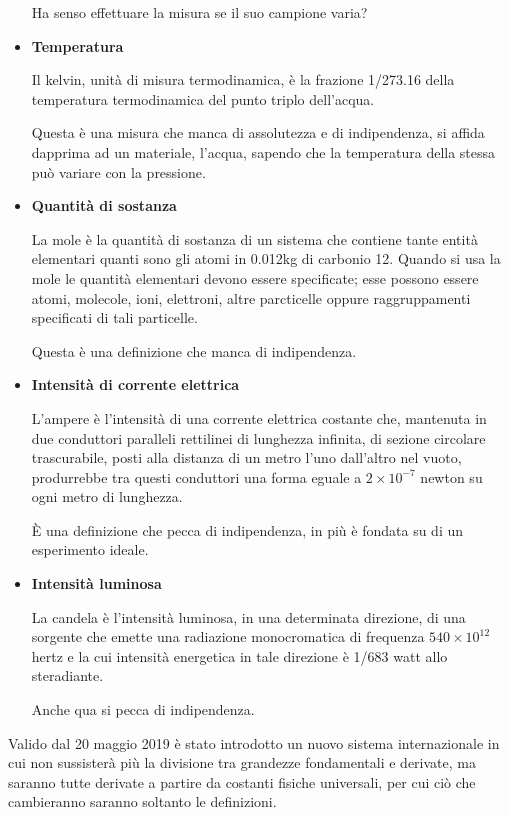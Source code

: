 \documentclass[a4paper, 15pt]{article}
\begin{document}
\begin{adjustwidth}{2in}{}
\begin{itemize}
		Ha senso effettuare la misura se il suo campione varia? 
		
		\item \textbf{Temperatura} 
		
		Il kelvin, unità di misura termodinamica, è la frazione 1/273.16 della temperatura termodinamica del punto triplo dell'acqua. 
		
		Questa è una misura che manca di assolutezza e di indipendenza, si affida dapprima ad un materiale, l'acqua, sapendo che la temperatura della stessa può variare con la pressione.
		
		\item \textbf{Quantità di sostanza }
		
		La mole è la quantità di sostanza di un sistema che contiene tante entità elementari quanti sono gli atomi in 0.012kg di carbonio 12. Quando si usa la mole le quantità elementari devono essere specificate; esse possono essere atomi, molecole, ioni, elettroni, altre parcticelle oppure raggruppamenti specificati di tali particelle. \newline
		
		Questa è una definizione che manca di indipendenza. 
		
		\item \textbf{Intensità di corrente elettrica} 
		
		L'ampere è l'intensità di una corrente elettrica costante che, mantenuta in due conduttori paralleli rettilinei di lunghezza infinita, di sezione circolare trascurabile, posti alla distanza di un metro l'uno dall'altro nel vuoto, produrrebbe tra questi conduttori una forma eguale a $2\times10^{-7}$ newton su ogni metro di lunghezza. \newline
		
		È una definizione che pecca di indipendenza, in più è fondata su di un esperimento ideale.
		
		\item \textbf{Intensità luminosa} 
		
		La candela è l'intensità luminosa, in una determinata direzione, di una sorgente che emette una radiazione monocromatica di frequenza $540\times10^{12}$ hertz e la cui intensità energetica in tale direzione è 1/683 watt allo steradiante. 
		
		Anche qua si pecca di indipendenza. 
	\end{itemize}
\newpage
	Valido dal 20 maggio 2019 è stato introdotto un nuovo sistema internazionale in cui non sussisterà più la divisione tra grandezze fondamentali e derivate, ma saranno tutte  derivate a partire da costanti fisiche universali, per cui ciò che cambieranno saranno soltanto le definizioni.
	

\end{adjustwidth}
\end{document}
